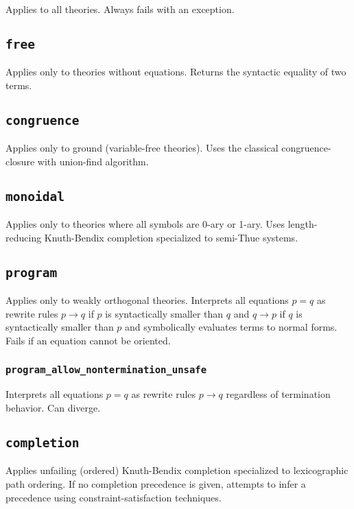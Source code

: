 \documentclass[10pt]{book}
\begin{document}
 Applies to all theories.  Always fails with an exception.
 
  \subsection{{\tt free}}
  
  Applies only to theories without equations.  Returns the syntactic equality of two terms.

\subsection{{\tt congruence}}

 Applies only to ground (variable-free theories).  Uses the classical congruence-closure with union-find algorithm.

\subsection{{\tt monoidal}}

Applies only to theories where all symbols are 0-ary or 1-ary.  Uses length-reducing Knuth-Bendix completion specialized to semi-Thue systems.

\subsection{{\tt program}}

Applies only to weakly orthogonal theories.  Interprets all equations $p = q$ as rewrite rules $p \to q$ if $p$ is syntactically smaller than $q$ and $q \to p$ if $q$ is syntactically smaller than $p$ and symbolically evaluates terms to normal forms.  Fails if an equation cannot be oriented.

\subsubsection{{\tt program\_allow\_nontermination\_unsafe}}

Interprets all equations $p = q$ as rewrite rules $p \to q$ regardless of termination behavior.  Can diverge.

\subsection{{\tt completion}}

Applies unfailing (ordered) Knuth-Bendix completion specialized to lexicographic path ordering.  If no completion precedence is given, attempts to infer a precedence using constraint-satisfaction techniques.
\end{document}
